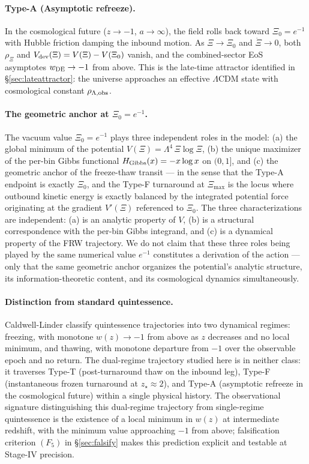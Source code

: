 \paragraph{Type-A (Asymptotic refreeze).}
In the cosmological future ($z \to -1$, $a \to \infty$), the field
rolls back toward $\Xi_0 = e^{-1}$ with Hubble friction damping the
inbound motion. As $\Xi \to \Xi_0$ and $\dot\Xi \to 0$, both $\rho_\Xi$
and $V_{\rm dev}(\Xi) = V(\Xi) - V(\Xi_0)$ vanish, and the
combined-sector EoS asymptotes $w_{\rm DE} \to -1$ from above. This is
the late-time attractor identified in \S\ref{sec:lateattractor}: the
universe approaches an effective $\Lambda$CDM state with cosmological
constant $\rho_{\Lambda,\rm obs}$.

\paragraph{The geometric anchor at $\Xi_0 = e^{-1}$.}
The vacuum value $\Xi_0 = e^{-1}$ plays three independent roles in the
model: (a) the global minimum of the potential $V(\Xi) = \Lambda^4\,\Xi
\log\Xi$, (b) the unique maximizer of the per-bin Gibbs functional
$H_{\rm Gibbs}(x) = -x \log x$ on $(0, 1]$, and (c) the geometric
anchor of the freeze-thaw transit --- in the sense that the Type-A
endpoint is exactly $\Xi_0$, and the Type-F turnaround at $\Xi_{\max}$
is the locus where outbound kinetic energy is exactly balanced by the
integrated potential force originating at the gradient $V'(\Xi)$
referenced to $\Xi_0$. The three characterizations are independent:
(a) is an analytic property of $V$, (b) is a structural correspondence
with the per-bin Gibbs integrand, and (c) is a dynamical property of
the FRW trajectory. We do not claim that these three roles being
played by the same numerical value $e^{-1}$ constitutes a derivation
of the action --- only that the same geometric anchor organizes the
potential's analytic structure, its information-theoretic content, and
its cosmological dynamics simultaneously.

\paragraph{Distinction from standard quintessence.}
Caldwell-Linder \cite{CaldwellLinder2005} classify quintessence
trajectories into two dynamical regimes: freezing, with monotone
$w(z) \to -1$ from above as $z$ decreases and no local minimum, and
thawing, with monotone departure from $-1$ over the observable epoch
and no return. The dual-regime trajectory studied here is in neither
class: it traverses Type-T (post-turnaround thaw on the inbound leg),
Type-F (instantaneous frozen turnaround at $z_\star \approx 2$), and
Type-A (asymptotic refreeze in the cosmological future) within a
single physical history. The observational signature distinguishing
this dual-regime trajectory from single-regime quintessence is the
existence of a local minimum in $w(z)$ at intermediate redshift, with
the minimum value approaching $-1$ from above; falsification criterion
$(F_5)$ in \S\ref{sec:falsify} makes this prediction explicit and
testable at Stage-IV precision.


